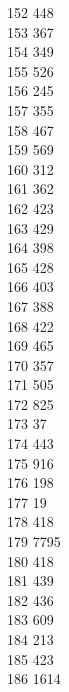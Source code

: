 { 152	448 \\
 153	367 \\
 154	349 \\
 155	526 \\
 156	245 \\
 157	355 \\
 158	467 \\
 159	569 \\
 160	312 \\
 161	362 \\
 162	423 \\
 163	429 \\
 164	398 \\
 165	428 \\
 166	403 \\
 167	388 \\
 168	422 \\
 169	465 \\
 170	357 \\
 171	505 \\
 172	825 \\
 173	37 \\
 174	443 \\
 175	916 \\
 176	198 \\
 177	19 \\
 178	418 \\
 179	7795 \\
 180	418 \\
 181	439 \\
 182	436 \\
 183	609 \\
 184	213 \\
 185	423 \\
 186	1614 \\
}

